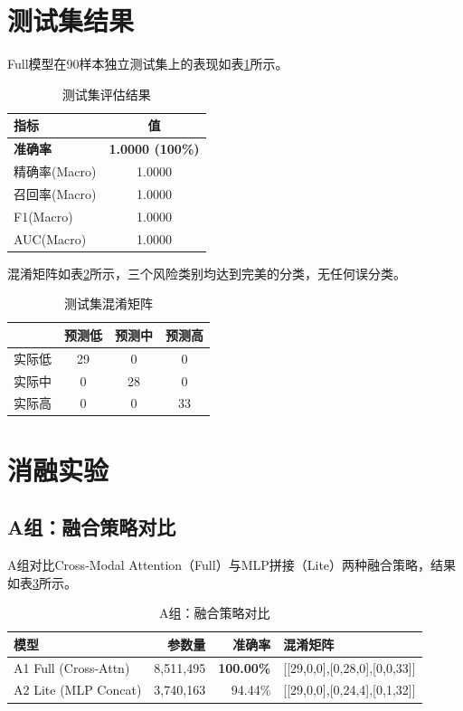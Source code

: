 \section{测试集结果}

Full模型在90样本独立测试集上的表现如表\ref{tab:test_results}所示。

\begin{table}[H]
\centering
\caption{测试集评估结果}
\label{tab:test_results}
\begin{tabular}{lc}
\toprule
指标 & 值 \\
\midrule
\textbf{准确率} & \textbf{1.0000 (100\%)} \\
精确率(Macro) & 1.0000 \\
召回率(Macro) & 1.0000 \\
F1(Macro) & 1.0000 \\
AUC(Macro) & 1.0000 \\
\bottomrule
\end{tabular}
\end{table}

混淆矩阵如表\ref{tab:confusion}所示，三个风险类别均达到完美的分类，无任何误分类。

\begin{table}[H]
\centering
\caption{测试集混淆矩阵}
\label{tab:confusion}
\begin{tabular}{lccc}
\toprule
 & 预测低 & 预测中 & 预测高 \\
\midrule
实际低 & 29 & 0 & 0 \\
实际中 & 0 & 28 & 0 \\
实际高 & 0 & 0 & 33 \\
\bottomrule
\end{tabular}
\end{table}

\section{消融实验}

\subsection{A组：融合策略对比}

A组对比Cross-Modal Attention（Full）与MLP拼接（Lite）两种融合策略，结果如表\ref{tab:ablation_a}所示。

\begin{table}[H]
\centering
\caption{A组：融合策略对比}
\label{tab:ablation_a}
\begin{tabular}{lrrl}
\toprule
模型 & 参数量 & 准确率 & 混淆矩阵 \\
\midrule
A1 Full (Cross-Attn) & 8,511,495 & \textbf{100.00\%} & [[29,0,0],[0,28,0],[0,0,33]] \\
A2 Lite (MLP Concat) & 3,740,163 & 94.44\% & [[29,0,0],[0,24,4],[0,1,32]] \\
\bottomrule
\end{tabular}
\end{table}

